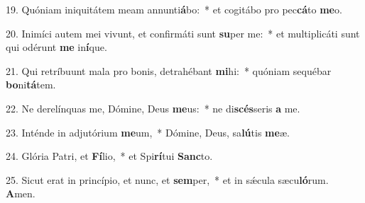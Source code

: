 19. Quóniam iniquitátem meam annunti\textbf{á}bo:~*  et cogitábo pro pec\textbf{cá}to \textbf{me}o.\

20. Inimíci autem mei vivunt, et confirmáti sunt \textbf{su}per me:~*  et multiplicáti sunt qui odérunt \textbf{me} in\textbf{í}que.\

21. Qui retríbuunt mala pro bonis, detrahébant \textbf{mi}hi:~*  quóniam sequébar \textbf{bo}ni\textbf{tá}tem.\

22. Ne derelínquas me, Dómine, Deus \textbf{me}us:~*  ne di\textbf{scés}seris \textbf{a} me.\

23. Inténde in adjutórium \textbf{me}um,~*  Dómine, Deus, sa\textbf{lú}tis \textbf{me}æ.\

24. Glória Patri, et \textbf{Fí}lio,~*  et Spi\textbf{rí}tui \textbf{Sanc}to.\

25. Sicut erat in princípio, et nunc, et \textbf{sem}per,~*  et in sǽcula sæcu\textbf{ló}rum. \textbf{A}men.\


